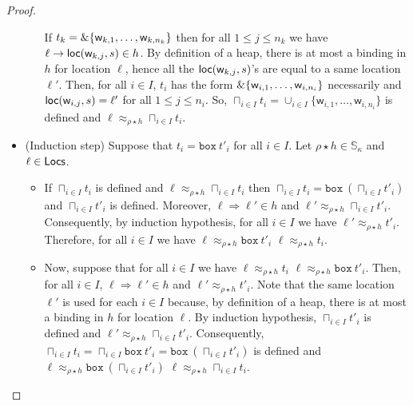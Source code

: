 \begin{proof}
\begin{itemize}
\begin{itemize}
      If $t_k=\&\{\mathsf{w}_{k,1},\ldots,\mathsf{w}_{k,n_k}\}$ then
      for all $1\le j\le n_k$ we have $\ell\to\mathsf{loc}(\mathsf{w}_{k,j},s)\in h$.
      By definition of a heap, there is at most a binding in $h$ for location
      $\ell$, hence all the $\mathsf{loc}(\mathsf{w}_{k,j},s)$'s are equal to a same
      location $\ell'$. Then, for all $i\in I$, $t_i$ has the form
      $\&\{\mathsf{w}_{i,1},\ldots,\mathsf{w}_{i,n_i}\}$ necessarily
      and $\mathsf{loc}(\mathsf{w}_{i,j},s)=\ell'$ for all $1\le j\le n_i$. So,
      $\sqcap_{i\in I}t_i = \cup_{i\in I}\{\mathsf{w}_{i,1},\ldots,\mathsf{w}_{i,n_i}\}$
      is defined and $\ell\approx_{\rho\star h}\sqcap_{i\in I}t_i$.
    \end{itemize}
    \item (Induction step) Suppose that $t_i=\mathtt{box}\ t'_i$ for all
    $i\in I$. Let $\rho\star h\in\mathbb{S}_\kappa$ and $\ell\in\mathsf{Locs}$.
    \begin{itemize}
      \item If $\sqcap_{i\in I}t_i$ is defined and
      $\ell\approx_{\rho\star h}\sqcap_{i\in I}t_i$ then
      $\sqcap_{i\in I}t_i = \mathtt{box}\ (\sqcap_{i\in I}t'_i)$ and
      $\sqcap_{i\in I}t'_i$ is defined. Moreover, $\ell\Rightarrow\ell'\in h$
      and $\ell'\approx_{\rho\star h}\sqcap_{i\in I}t'_i$. Consequently,
      by induction hypothesis, for all $i\in I$ we have
      $\ell'\approx_{\rho\star h}t'_i$. Therefore, for all $i\in I$ we have
      $\ell\approx_{\rho\star h}\mathtt{box}\ t'_i$ \ie
      $\ell\approx_{\rho\star h}t_i$.
      \item Now, suppose that for all $i\in I$ we have $\ell\approx_{\rho\star h}t_i$
      \ie $\ell\approx_{\rho\star h}\mathtt{box}\ t'_i$. Then, for all $i\in I$,
      $\ell\Rightarrow\ell'\in h$ and $\ell'\approx_{\rho\star h}t'_i$.
      Note that the same location $\ell'$ is used for each $i\in I$ because,
      by definition of a heap, there is at most a binding in $h$ for location $\ell$.
      By induction hypothesis, $\sqcap_{i\in I}t'_i$ is defined and
      $\ell'\approx_{\rho\star h}\sqcap_{i\in I}t'_i$.
      Consequently, $\sqcap_{i\in I}t_i = \sqcap_{i\in I} \mathtt{box}\ t'_i =
      \mathtt{box}\ (\sqcap_{i\in I}t'_i)$ is defined and
      $\ell\approx_{\rho\star h}\mathtt{box}\ (\sqcap_{i\in I}t'_i)$ \ie
      $\ell\approx_{\rho\star h}\sqcap_{i\in I}t_i$.
    \end{itemize}
  \end{itemize}
\end{proof}

